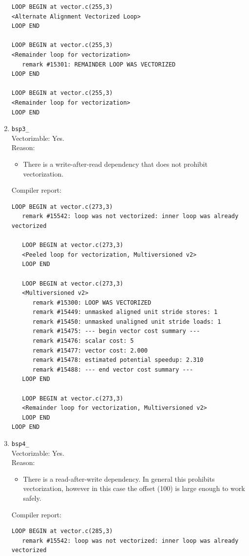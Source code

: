 \documentclass[11pt]{article}
\begin{document}
\begin{enumerate}
\begin{lstlisting}
LOOP BEGIN at vector.c(255,3)
<Alternate Alignment Vectorized Loop>
LOOP END

LOOP BEGIN at vector.c(255,3)
<Remainder loop for vectorization>
   remark #15301: REMAINDER LOOP WAS VECTORIZED
LOOP END

LOOP BEGIN at vector.c(255,3)
<Remainder loop for vectorization>
LOOP END
\end{lstlisting}

\item \texttt{bsp3\_}\\
Vectorizable: Yes.\\
Reason:
\begin{itemize}
\item There is a write-after-read dependency that does not prohibit vectorization.
\end{itemize}
Compiler report:
\begin{lstlisting}
LOOP BEGIN at vector.c(273,3)
   remark #15542: loop was not vectorized: inner loop was already vectorized

   LOOP BEGIN at vector.c(273,3)
   <Peeled loop for vectorization, Multiversioned v2>
   LOOP END

   LOOP BEGIN at vector.c(273,3)
   <Multiversioned v2>
      remark #15300: LOOP WAS VECTORIZED
      remark #15449: unmasked aligned unit stride stores: 1 
      remark #15450: unmasked unaligned unit stride loads: 1 
      remark #15475: --- begin vector cost summary ---
      remark #15476: scalar cost: 5 
      remark #15477: vector cost: 2.000 
      remark #15478: estimated potential speedup: 2.310 
      remark #15488: --- end vector cost summary ---
   LOOP END

   LOOP BEGIN at vector.c(273,3)
   <Remainder loop for vectorization, Multiversioned v2>
   LOOP END
LOOP END
\end{lstlisting}

\item \texttt{bsp4\_}\\
Vectorizable: Yes.\\
Reason:
\begin{itemize}
\item There is a read-after-write dependency. In general this prohibits vectorization, however in this case the offset (100) is large enough to work safely.
\end{itemize}
Compiler report:
\begin{lstlisting}
LOOP BEGIN at vector.c(285,3)
   remark #15542: loop was not vectorized: inner loop was already vectorized


\end{lstlisting}
\end{enumerate}
\end{document}
